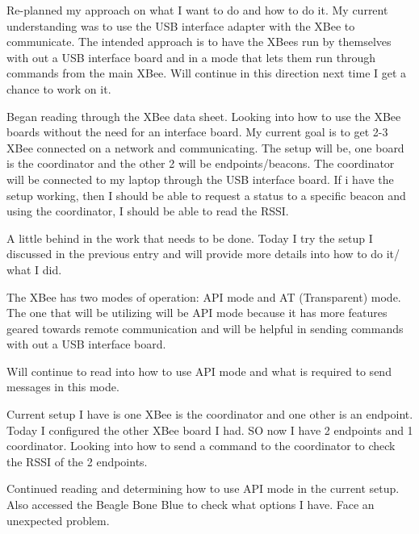 \documentclass[fontsize=11pt, %
                             paper=letter, %
                             twoside, %
                             captions=tableheading,
                             index=totoc,
                             hyperref]{labbook}
\begin{document}
\begin{addmargin}[0cm]{0cm}
Re-planned my approach on what I want to do and how to do it. My current understanding was to use the USB interface adapter with the XBee to communicate. The intended approach is to have the XBees run by themselves with out a USB interface board and in a mode that lets them run through commands from the main XBee. Will continue in this direction next time I get a chance to work on it.

Began reading through the XBee data sheet. Looking into how to use the XBee boards without the need for an interface board. My current goal is to get 2-3 XBee connected on a network and communicating. The setup will be, one board is the coordinator and the other 2 will be endpoints/beacons. The coordinator will be connected to my laptop through the USB interface board. If i have the setup working, then I should be able to request a status to a specific beacon and using the coordinator, I should be able to read the RSSI.


A little behind in the work that needs to be done. Today I try the setup I discussed in the previous entry and will provide more details into how to do it/ what I did. 

The XBee has two modes of operation: API mode and AT (Transparent) mode.
The one that will be utilizing will be API mode because it has more features geared towards remote communication and will be helpful in sending commands with out a USB interface board. 

Will continue to read into how to use API mode and what is required to send messages in this mode.

Current setup I have is one XBee is the coordinator and one other is an endpoint. Today I configured the other XBee board I had. SO now I have 2 endpoints and 1 coordinator. Looking into how to send a command to the coordinator to check the RSSI of the 2 endpoints.

Continued reading and determining how to use API mode in the current setup. Also accessed the Beagle Bone Blue to check what options I have. Face an unexpected problem.


\end{addmargin}
\end{document}

